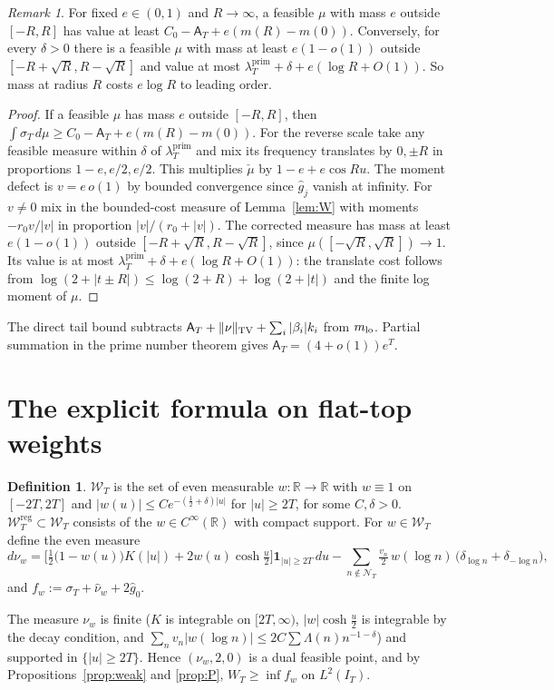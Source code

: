 \documentclass[10pt]{amsart}
\theoremstyle{definition}
\newtheorem{definition}[theorem]{Definition}
\theoremstyle{remark}
\newtheorem{remark}[theorem]{Remark}
\newcommand{\R}{\mathbb R}
\newcommand{\IT}{I_T}
\newcommand{\lamP}{\lambda^{\mathrm{prim}}_T}
\newcommand{\sT}{\sigma_T}
\newcommand{\gh}[1]{\widehat g_{#1}}
\newcommand{\nuh}{\widehat\nu}
\newcommand{\Wcl}{\mathcal W_T}
\newcommand{\NT}{\mathcal N_T}
\newcommand{\Aconst}{\mathsf A_T}
\begin{document}
\begin{remark}
For fixed $e\in(0,1)$ and $R\to\infty$, a feasible $\mu$ with mass $e$ outside $[-R,R]$ has value at least
$C_0-\Aconst+e(m(R)-m(0))$. Conversely, for every $\delta>0$ there is a feasible $\mu$ with mass at least
$e(1-o(1))$ outside $[-R+\sqrt R,R-\sqrt R]$ and value at most $\lamP+\delta+e(\log R+O(1))$. So mass at
radius $R$ costs $e\log R$ to leading order.
\end{remark}
\begin{proof}
If a feasible $\mu$ has mass $e$ outside $[-R,R]$, then
$\int\sT\,d\mu\ge C_0-\Aconst+e(m(R)-m(0))$. For the reverse scale
take any feasible measure within $\delta$ of $\lamP$ and mix its
frequency translates by $0,\pm R$ in proportions $1-e,e/2,e/2$.
This multiplies $\check\mu$ by $1-e+e\cos Ru$. The moment defect is
$v=e\,o(1)$ by bounded convergence since $\gh j$ vanish at infinity.
For $v\ne0$ mix in the bounded-cost measure of Lemma~\ref{lem:W}
with moments $-r_0v/|v|$ in proportion $|v|/(r_0+|v|)$.
The corrected measure has mass at least $e(1-o(1))$ outside
$[-R+\sqrt R,R-\sqrt R]$, since $\mu([-\sqrt R,\sqrt R])\to1$.
Its value is at most $\lamP+\delta+e(\log R+O(1))$: the translate
cost follows from $\log(2+|t\pm R|)\le\log(2+R)+\log(2+|t|)$
and the finite log moment of $\mu$.
\end{proof}

The direct tail bound subtracts $\Aconst+\|\nu\|_{\rm TV}
+\sum_i|\beta_i|k_i$ from $m_{\rm lo}$. Partial summation in the prime
number theorem gives $\Aconst=(4+o(1))e^T$.

\section{The explicit formula on flat-top weights}\label{sec:Z}

\begin{definition}\label{def:W}
$\Wcl$ is the set of even measurable $w:\R\to\R$ with $w\equiv1$ on $[-2T,2T]$ and
$|w(u)|\le Ce^{-(\frac12+\delta)|u|}$ for $|u|\ge2T$, for some $C,\delta>0$. $\Wcl^{\mathrm{reg}}\subset\Wcl$
consists of the $w\in C^\infty(\R)$ with compact support. For $w\in\Wcl$ define the even measure
\begin{equation}\label{eq:nuw}
d\nu_w=\Big[\tfrac12\big(1-w(u)\big)K(|u|)+2w(u)\cosh\tfrac u2\Big]\mathbf 1_{|u|\ge2T}\,du
-\sum_{n\notin\NT}\tfrac{v_n}2\,w(\log n)\,\big(\delta_{\log n}+\delta_{-\log n}\big),
\end{equation}
and $f_w:=\sT+\nuh_w+2\gh0$.
\end{definition}
The measure $\nu_w$ is finite ($K$ is integrable on $[2T,\infty)$, $|w|\cosh\frac u2$ is
integrable by the decay condition, and $\sum_nv_n|w(\log n)|\le2C\sum\Lambda(n)n^{-1-\delta}$) and
supported in $\{|u|\ge2T\}$. Hence $(\nu_w,2,0)$ is a dual feasible point, and by
Propositions~\ref{prop:weak} and \ref{prop:P}, $W_T\ge\inf f_w$ on $L^2(\IT)$.
\end{document}
